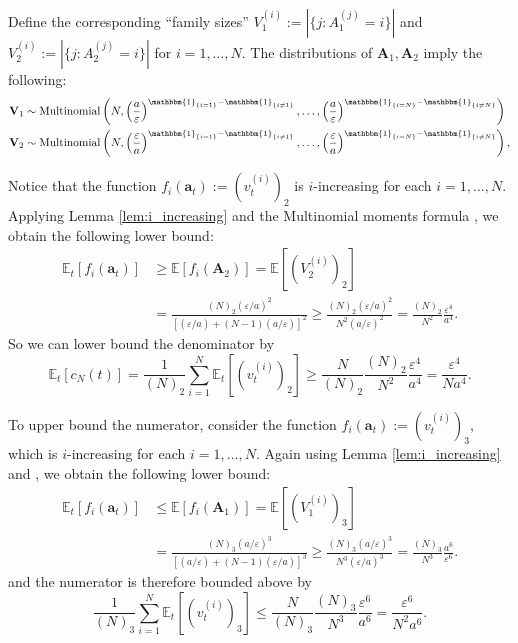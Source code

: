 \documentclass[fleqn]{article}
\theoremstyle{definition}
\newcommand{\E}{\mathbb{E}}
\newcommand{\1}[1]{\mathbbm{1}_{\{#1\}}}
\newcommand{\Mn}{\operatorname{Multinomial}}
\newcommand{\vt}[2][t]{v_{#1}^{(#2)}}
\begin{document}
Define the corresponding ``family sizes'' $V_1^{(i)} := |\{j: A_1^{(j)}=i\}|$ and $V_2^{(i)} := |\{j: A_2^{(j)}=i\}|$ for $i=1,\dots,N$. The distributions of $\mathbf{A}_1, \mathbf{A}_2$ imply the following:
\begin{align*}
& \mathbf{V}_1 \sim \Mn\left(N, \left( \frac{a}{\varepsilon} \right)^{\1{i=1} -\1{i\neq 1}} ,\dots, \left( \frac{a}{\varepsilon} \right)^{\1{i=N} -\1{i\neq N}} \right) \\
& \mathbf{V}_2 \sim \Mn\left(N, \left( \frac{\varepsilon}{a} \right)^{\1{i=1} -\1{i\neq 1}} ,\dots, \left( \frac{\varepsilon}{a} \right)^{\1{i=N} -\1{i\neq N}} \right),
\end{align*}

Notice that the function $f_i(\mathbf{a}_t) := (\vt{i})_2$ is $i$-increasing for each $i=1,\dots,N$. Applying Lemma \ref{lem:i_increasing} and the Multinomial moments formula \citep{mosimann1962}, we obtain the following lower bound:
\begin{align*}
\E_t[f_i(\mathbf{a}_t)] &\geq \E[f_i(\mathbf{A}_2)] = \E[(V_2^{(i)})_2] \\
&= \frac{(N)_2 (\varepsilon/a)^2}{[(\varepsilon/a) + (N-1)(a/\varepsilon)]^2}
\geq \frac{(N)_2 (\varepsilon/a)^2}{N^2(a/\varepsilon)^2}
= \frac{(N)_2}{N^2}\frac{\varepsilon^4}{a^4}.
\end{align*}
So we can lower bound the denominator by
\begin{equation*}
\E_t[c_N(t)] = \frac{1}{(N)_2} \sum_{i=1}^N \E_t[(\vt{i})_2]
\geq \frac{N}{(N)_2} \frac{(N)_2}{N^2}\frac{\varepsilon^4}{a^4}
= \frac{\varepsilon^4}{Na^4}.
\end{equation*}

To upper bound the numerator, consider the function $f_i(\mathbf{a}_t) := (\vt{i})_3$, which is $i$-increasing for each $i=1,\dots,N$.
Again using Lemma \ref{lem:i_increasing} and \citep{mosimann1962}, we obtain the following lower bound:
\begin{align*}
\E_t[f_i(\mathbf{a}_t)] &\leq \E[f_i(\mathbf{A}_1)] = \E[(V_1^{(i)})_3] \\
&= \frac{(N)_3 (a/\varepsilon)^3}{[(a/\varepsilon) + (N-1)(\varepsilon/a)]^3}
\geq \frac{(N)_3 (a/\varepsilon)^3}{N^3(\varepsilon/a)^3}
= \frac{(N)_3}{N^3}\frac{a^6}{\varepsilon^6}.
\end{align*}
and the numerator is therefore bounded above by
\begin{equation*}
\frac{1}{(N)_3} \sum_{i=1}^N \E_t[(\vt{i})_3]
\leq \frac{N}{(N)_3} \frac{(N)_3}{N^3}\frac{\varepsilon^6}{a^6}
= \frac{\varepsilon^6}{N^2a^6}.
\end{equation*}
\end{document}
